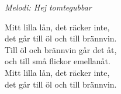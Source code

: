 {\footnotesize\textit{Melodi: Hej tomtegubbar}}\par
\vspace{10pt}
\revrpt Mitt lilla lån, det räcker inte,\\
det går till öl och till brännvin.\rpt\\
Till öl och brännvin går det åt,\\
och till små flickor emellanåt.\\
Mitt lilla lån, det räcker inte,\\
det går till öl och till brännvin.\par
\vspace{10pt}

